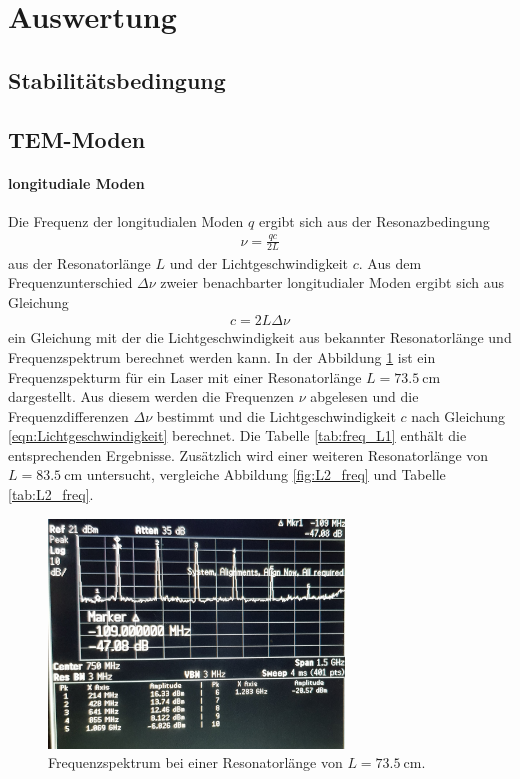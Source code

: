\section{Auswertung}
\label{sec:Auswertung}



\subsection{Stabilitätsbedingung}
\label{subsec:Stabil}



\subsection{TEM-Moden}
\label{subsec:tem}
\paragraph{longitudiale Moden}
Die Frequenz der longitudialen Moden $q$
ergibt sich aus der Resonazbedingung
\begin{align}
  \nu=\frac{qc}{2L} \label{eqn:longi_mode}
\end{align}
aus der Resonatorlänge $L$ und der Lichtgeschwindigkeit $c$.
Aus dem Frequenzunterschied $\Delta \nu$ zweier benachbarter longitudialer Moden
ergibt sich aus Gleichung \label{eqn:longi_mode}
\begin{align}
  c = 2L\Delta \nu  \label{eqn:Lichtgeschwindigkeit}
\end{align}
ein Gleichung mit der die Lichtgeschwindigkeit aus bekannter Resonatorlänge und Frequenzspektrum
berechnet werden kann.
In der Abbildung \ref{fig:L1_freq} ist ein Frequenzspekturm für ein Laser mit einer Resonatorlänge $L=\SI{73.5}{\centi\meter}$
dargestellt. Aus diesem werden die Frequenzen $\nu$ abgelesen
 und die Frequenzdifferenzen $\Delta \nu $ bestimmt und die Lichtgeschwindigkeit $c$ nach Gleichung \ref{eqn:Lichtgeschwindigkeit}
berechnet.
Die Tabelle \ref{tab:freq_L1} enthält die entsprechenden Ergebnisse.
Zusätzlich wird einer weiteren Resonatorlänge von $L = \SI{83.5}{\centi\meter}$  untersucht,
vergleiche Abbildung \ref{fig:L2_freq} und Tabelle \ref{tab:L2_freq}.

\begin{figure}
  \includegraphics[width=0.7\textwidth]{pictures/freq_1.jpg}
  \caption{Frequenzspektrum bei einer Resonatorlänge von $L=\SI{73.5}{\centi\meter}$.}
  \label{fig:L1_freq}
\end{figure}

